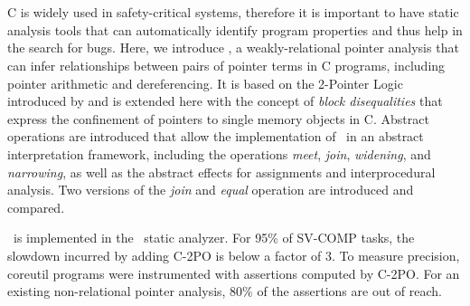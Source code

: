 \chapter{\abstractname}

C is widely used in safety-critical systems, therefore it is important to have static analysis tools that can automatically identify program properties and thus help in the search for bugs.
Here, we introduce \cpo, a weakly-relational pointer analysis that can infer relationships between pairs of pointer terms in C programs, including pointer arithmetic and dereferencing.
It is based on the 2-Pointer Logic introduced by \textcite{2pointer} and is extended here with the concept of \emph{block disequalities} that express the confinement of pointers to single memory objects in C.
Abstract operations are introduced that allow the implementation of \cpo\ in an abstract interpretation framework, including the operations \emph{meet}, \emph{join}, \emph{widening}, and \emph{narrowing}, as well as the abstract effects for assignments and interprocedural analysis.
Two versions of the \emph{join} and \emph{equal} operation are introduced and compared.

\cpo\ is implemented in the \goblint\ static analyzer.
For 95\% of SV-COMP tasks, the slowdown incurred by adding
C-2PO is below a factor of 3. To measure precision, coreutil programs were instrumented with assertions computed by C-2PO.\@
For an existing non-relational pointer analysis, 80\% of the assertions are out of reach.
